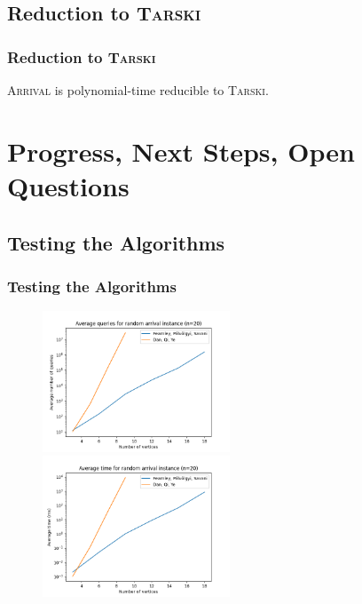 \documentclass{beamer}
\begin{document}
\subsection{Reduction to \textsc{Tarski}}
\begin{frame}
\frametitle{Reduction to \textsc{Tarski}}
    \begin{Theorem}
        \textsc{Arrival} is polynomial-time reducible to \textsc{Tarski}.
    \end{Theorem}
\end{frame}


\section{Progress, Next Steps, Open Questions}
\subsection{Testing the Algorithms}
\begin{frame}
\frametitle{Testing the Algorithms}
    \begin{figure}[t]
        \centering
        \includegraphics[width=2.2in]{avQueries.png}
        \centering
        \includegraphics[width=2.2in]{avTime.png}
    \end{figure}
\end{frame}
\end{document}
